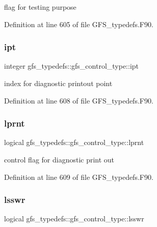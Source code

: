 flag for testing purpose 



Definition at line 605 of file G\+F\+S\+\_\+typedefs.\+F90.

\mbox{\label{structgfs__typedefs_1_1gfs__control__type_a3e2599a246debab9c022761f038d8396}} 
\subsubsection{ipt}
{\footnotesize\ttfamily integer gfs\+\_\+typedefs\+::gfs\+\_\+control\+\_\+type\+::ipt}



index for diagnostic printout point 



Definition at line 608 of file G\+F\+S\+\_\+typedefs.\+F90.

\mbox{\label{structgfs__typedefs_1_1gfs__control__type_a72e0ee93b78dd3dde829ebe2a3e96250}} 
\subsubsection{lprnt}
{\footnotesize\ttfamily logical gfs\+\_\+typedefs\+::gfs\+\_\+control\+\_\+type\+::lprnt}



control flag for diagnostic print out 



Definition at line 609 of file G\+F\+S\+\_\+typedefs.\+F90.

\mbox{\label{structgfs__typedefs_1_1gfs__control__type_adf8959b1c525cb151a08097a95c576a8}} 
\subsubsection{lsswr}
{\footnotesize\ttfamily logical gfs\+\_\+typedefs\+::gfs\+\_\+control\+\_\+type\+::lsswr}



